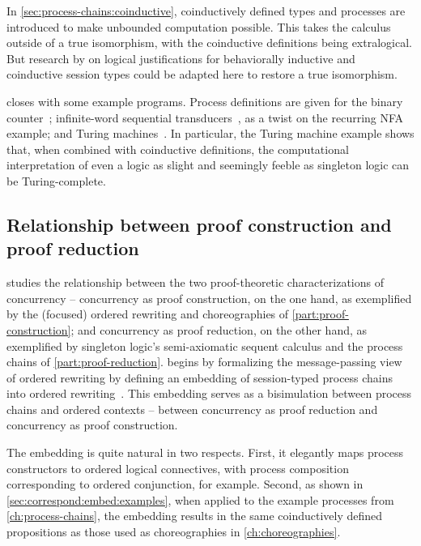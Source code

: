 In \cref{sec:process-chains:coinductive}, coinductively defined types and processes are introduced to make unbounded computation possible.
This takes the calculus outside of a true isomorphism, with the coinductive definitions being extralogical.
But research by \textcites{Derakhshan+Pfenning:LMCS20}{Somayyajula+Pfenning:20} on logical justifications for behaviorally inductive and coinductive session types could be adapted here to restore a true isomorphism.

 closes with some example programs.
Process definitions are given for the binary counter~; infinite-word sequential transducers~, as a twist on the recurring \acs*{NFA} example; and Turing machines~.
In particular, the Turing machine example shows that, when combined with coinductive definitions, the computational interpretation of even a logic as slight and seemingly feeble as singleton logic can be Turing-complete.

\subsection[Relationship between proof construction and reduction]{Relationship between proof construction and proof reduction}

 studies the relationship between the two proof-theoretic characterizations of concurrency -- concurrency as proof construction, on the one hand, as exemplified by the (focused) ordered rewriting and choreographies of \cref{part:proof-construction}; and concurrency as proof reduction,  on the other hand, as exemplified by singleton logic's semi-axiomatic sequent calculus and the process chains of \cref{part:proof-reduction}.
 begins by formalizing the message-passing view of ordered rewriting by defining an embedding of session-typed process chains into ordered rewriting~.
This embedding serves as a bisimulation between process chains and ordered contexts -- between concurrency as proof reduction and concurrency as proof construction.

The embedding is quite natural in two respects.  
First, it elegantly maps process constructors to ordered logical connectives, with process composition corresponding to ordered conjunction, for example.
Second, as shown in \cref{sec:correspond:embed:examples}, when applied to the example processes from \cref{ch:process-chains}, the embedding results in the same coinductively defined propositions as those used as choreographies in \cref{ch:choreographies}.

